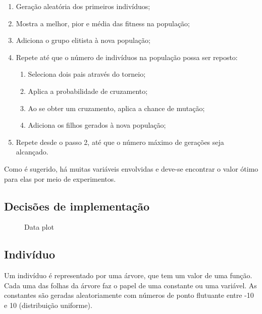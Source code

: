 \documentclass[11pt]{article}
\begin{document}
\begin{enumerate}
	\item Geração aleatória dos primeiros indivíduos;
	\item Mostra a melhor, pior e média das fitness na população;
	\item Adiciona o grupo elitista à nova população;
	\item Repete até que o número de indivíduos na população possa ser reposto:
	\begin{enumerate}
		\item Seleciona dois pais através do torneio;
		\item Aplica a probabilidade de cruzamento;
		\item Ao se obter um cruzamento, aplica a chance de mutação;
		\item Adiciona os filhos gerados à nova população;
	\end{enumerate}
	\item Repete desde o passo 2, até que o número máximo de gerações seja alcançado.
\end{enumerate}

Como é sugerido, há muitas variáveis envolvidas e deve-se encontrar o valor ótimo para elas por meio de experimentos.

\subsection{Decisões de implementação}

\begin{figure}[!ht]
    \centering
    \caption{Data plot}
    \label{fig:data}
  \end{figure}
  
\subsection*{Indivíduo}

Um indivíduo é representado por uma árvore, que tem um valor de uma função. Cada uma das folhas da árvore faz o papel de uma constante ou uma variável. As constantes são geradas aleatoriamente com números de ponto flutuante entre -10 e 10 (distribuição uniforme).
\end{document}
